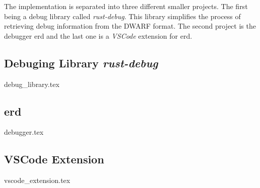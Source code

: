  

The implementation is separated into three different smaller projects.
The first being a debug library called \emph{rust-debug}.
This library simplifies the process of retrieving debug information from the \gls{DWARF} format.
The second project is the debugger \gls{erd} and the last one is a \emph{VSCode} extension for \gls{erd}.


\subsection{Debuging Library \emph{rust-debug}}
\label{subsection:rust-debug}
{debug_library.tex}


\subsection{\acrfull{erd}}
{debugger.tex}


\subsection{VSCode Extension}
{vscode_extension.tex}

